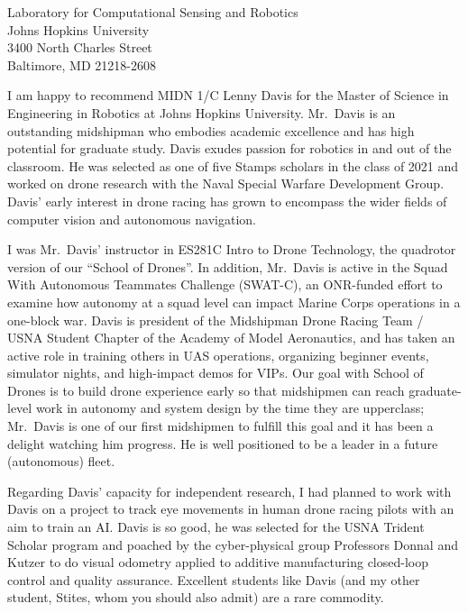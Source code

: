 \documentclass[10pt]{wrceletter}
\date{\today}
\begin{document}
\begin{letter}{%
Laboratory for Computational Sensing and Robotics\\
Johns Hopkins University\\
3400 North Charles Street\\
Baltimore, MD 21218-2608}

\opening{}
\raggedright %
\setlength{\parindent}{15pt} %

I am happy to recommend MIDN 1/C Lenny Davis for the Master of Science in Engineering in Robotics at Johns Hopkins University.  Mr.~Davis is an outstanding midshipman who embodies academic excellence and has high potential for graduate study. Davis exudes passion for robotics in and out of the classroom. He was selected as one of five Stamps scholars in the class of 2021 and worked on drone research with the Naval Special Warfare Development Group. Davis' early interest in drone racing has grown to encompass the wider fields of computer vision and autonomous navigation.  

I was Mr.~Davis’ instructor in ES281C Intro to Drone Technology, the quadrotor version of our ``School of Drones''. In addition, Mr.~Davis is active in the Squad With Autonomous Teammates Challenge (SWAT-C), an ONR-funded effort to examine how autonomy at a squad level can impact Marine Corps operations in a one-block war. Davis is president of the Midshipman Drone Racing Team / USNA Student Chapter of the Academy of Model Aeronautics, and has taken an active role in training others in UAS operations, organizing beginner events, simulator nights, and high-impact demos for VIPs.  Our goal with School of Drones is to build drone experience early so that midshipmen can reach graduate-level work in autonomy and system design by the time they are upperclass; Mr.~Davis is one of our first midshipmen to fulfill this goal and it has been a delight watching him progress. He is well positioned to be a leader in a future (autonomous) fleet. 

Regarding Davis' capacity for independent research, I had planned to work with Davis on a project to track eye movements in human drone racing pilots with an aim to train an AI.  Davis is so good, he was selected for the USNA Trident Scholar program and poached by the cyber-physical group Professors Donnal and Kutzer to do visual odometry applied to additive manufacturing closed-loop control and quality assurance. Excellent students like Davis (and my other student, Stites, whom you should also admit) are a rare commodity.


\end{letter}
\end{document}
